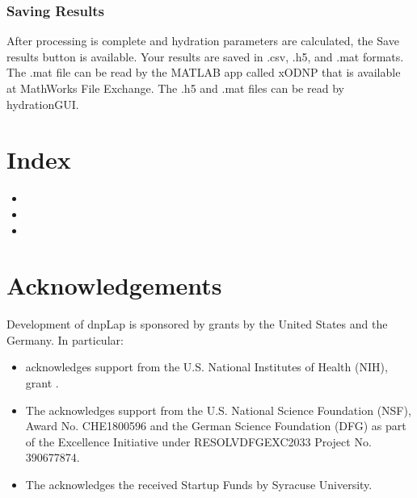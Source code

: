 \documentclass[letterpaper,10pt,english]{sphinxmanual}
\begin{document}
\subsection{Saving Results}
\label{\detokenize{hydrationGUI:saving-results}}
After processing is complete and hydration parameters are calculated, the Save results button is available. Your results are saved in .csv, .h5, and .mat formats. The .mat file can be read by the MATLAB app called xODNP that is available at MathWorks File Exchange. The .h5 and .mat files can be read by hydrationGUI.


\chapter{Index}
\label{\detokenize{index:index}}\begin{itemize}
\item {} 

\item {} 

\item {} 

\end{itemize}


\chapter{Acknowledgements}
\label{\detokenize{index:acknowledgements}}
Development of dnpLap is sponsored by grants by the United States and the Germany. In particular:
\begin{itemize}
\item {} 
 acknowledges support from the U.S. National Institutes of Health (NIH), grant .

\item {} 
The  acknowledges support from the U.S. National Science Foundation (NSF), Award No. CHE\sphinxhyphen{}1800596 and the German Science Foundation (DFG) as part of the Excellence Initiative under RESOLVDFG\sphinxhyphen{}EXC\sphinxhyphen{}2033 Project No. 390677874.

\item {} 
The  acknowledges the received Startup Funds by Syracuse University.

\end{itemize}
\end{document}
